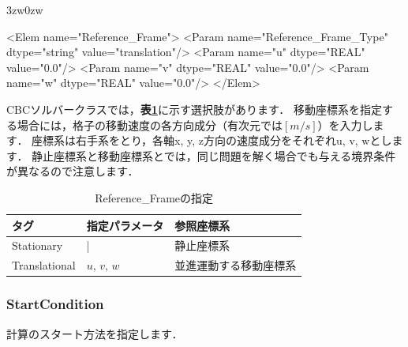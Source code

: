 \begin{indentation}{3zw}{0zw}
\small

\begin{program}
<Elem name="Reference_Frame">
  <Param name="Reference_Frame_Type" dtype="string" value="translation"/>
  <Param name="u" dtype="REAL" value="0.0"/>
  <Param name="v" dtype="REAL" value="0.0"/>
  <Param name="w" dtype="REAL" value="0.0"/>
</Elem>
\end{program}

\normalsize
CBCソルバークラスでは，\textbf{表\ref{tbl:ref_frame}}に示す選択肢があります．
移動座標系を指定する場合には，格子の移動速度の各方向成分（有次元では$[m/s]$）を入力します．
座標系は右手系をとり，各軸x, y, z方向の速度成分をそれぞれu, v, wとします．
静止座標系と移動座標系とでは，同じ問題を解く場合でも与える境界条件が異なるので注意します．

\begin{table}[htdp]
\caption{Reference\_Frameの指定}
\begin{center}
\small
\begin{tabular}{lll} \toprule
タグ & 指定パラメータ & 参照座標系\\ \midrule
Stationary & | & 静止座標系\\
Translational & $u,\,v,\,w$ & 並進運動する移動座標系\\ \bottomrule
\end{tabular}
\end{center}
\label{tbl:ref_frame}
\end{table}

\end{indentation}



\pagebreak
\subsubsection{StartCondition}

計算の\hypertarget{tgt:start_condition}{スタート方法}を指定します．


